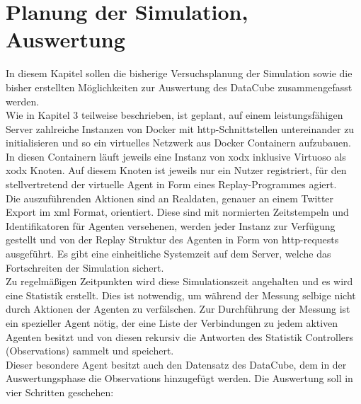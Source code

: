 \documentclass{article}
\begin{document}
\section{Planung der Simulation, Auswertung}

In diesem Kapitel sollen die bisherige Versuchsplanung der Simulation sowie die bisher erstellten Möglichkeiten zur Auswertung des DataCube zusammengefasst werden.\\
Wie in Kapitel 3 teilweise beschrieben, ist geplant, auf einem leistungsfähigen Server zahlreiche Instanzen von Docker mit http-Schnittstellen untereinander zu initialisieren und so ein virtuelles Netzwerk aus Docker Containern aufzubauen. In diesen Containern läuft jeweils eine Instanz von xodx inklusive Virtuoso als xodx Knoten. Auf diesem Knoten ist jeweils nur ein Nutzer registriert, für den stellvertretend der virtuelle Agent in Form eines Replay-Programmes agiert.\\
Die auszuführenden Aktionen sind an Realdaten, genauer an einem Twitter Export im xml Format, orientiert. Diese sind mit normierten Zeitstempeln und Identifikatoren für Agenten versehenen, werden jeder Instanz zur Verfügung gestellt und von der Replay Struktur des Agenten in Form von http-requests ausgeführt. Es gibt eine einheitliche Systemzeit auf dem Server, welche das Fortschreiten der Simulation sichert.\\
Zu regelmäßigen Zeitpunkten wird diese Simulationszeit angehalten und es wird eine Statistik erstellt. Dies ist notwendig, um während der Messung selbige nicht durch Aktionen der Agenten zu verfälschen. Zur Durchführung der Messung ist ein spezieller Agent nötig, der eine Liste der Verbindungen zu jedem aktiven Agenten besitzt und von diesen rekursiv die Antworten des Statistik Controllers (Observations) sammelt und speichert.\\
Dieser besondere Agent besitzt auch den Datensatz des DataCube, dem in der Auswertungsphase die Observations hinzugefügt werden. Die Auswertung soll in vier Schritten geschehen:
\end{document}
